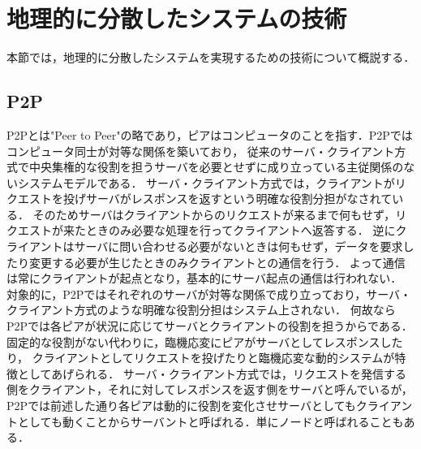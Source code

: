 \section{地理的に分散したシステムの技術}
\label{background:geographically-disdtributed-system-technology}
本節では，地理的に分散したシステムを実現するための技術について概説する．

\subsection{P2P}
P2Pとは"Peer to Peer"の略であり，ピアはコンピュータのことを指す．P2Pではコンピュータ同士が対等な関係を築いており，
従来のサーバ・クライアント方式で中央集権的な役割を担うサーバを必要とせずに成り立っている主従関係のないシステムモデルである．
サーバ・クライアント方式では，クライアントがリクエストを投げサーバがレスポンスを返すという明確な役割分担がなされている．
そのためサーバはクライアントからのリクエストが来るまで何もせず，リクエストが来たときのみ必要な処理を行ってクライアントへ返答する．
逆にクライアントはサーバに問い合わせる必要がないときは何もせず，データを要求したり変更する必要が生じたときのみクライアントとの通信を行う．
よって通信は常にクライアントが起点となり，基本的にサーバ起点の通信は行われない．
対象的に，P2Pではそれぞれのサーバが対等な関係で成り立っており，サーバ・クライアント方式のような明確な役割分担はシステム上されない．
何故ならP2Pでは各ピアが状況に応じてサーバとクライアントの役割を担うからである．固定的な役割がない代わりに，臨機応変にピアがサーバとしてレスポンスしたり，
クライアントとしてリクエストを投げたりと臨機応変な動的システムが特徴としてあげられる．
サーバ・クライアント方式では，リクエストを発信する側をクライアント，それに対してレスポンスを返す側をサーバと呼んでいるが，
P2Pでは前述した通り各ピアは動的に役割を変化させサーバとしてもクライアントとしても動くことからサーバントと呼ばれる．単にノードと呼ばれることもある．

